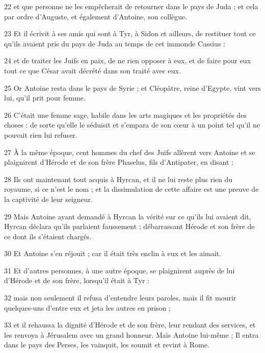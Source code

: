 \par 22 et que personne ne les empêcherait de retourner dans le pays de Juda ; et cela par ordre d'Auguste, et également d'Antoine, son collègue.

\par 23 Et il écrivit à ses amis qui sont à Tyr, à Sidon et ailleurs, de restituer tout ce qu'ils avaient pris du pays de Juda au temps de cet immonde Cassius :

\par 24 et de traiter les Juifs en paix, de ne rien opposer à eux, et de faire pour eux tout ce que César avait décrété dans son traité avec eux.

\par 25 Or Antoine resta dans le pays de Syrie ; et Cléopâtre, reine d'Egypte, vint vers lui, qu'il prit pour femme.

\par 26 C'était une femme sage, habile dans les arts magiques et les propriétés des choses : de sorte qu'elle le séduisit et s'empara de son cœur à un point tel qu'il ne pouvait rien lui refuser.

\par 27 À la même époque, cent hommes du chef des Juifs allèrent vers Antoine et se plaignirent d'Hérode et de son frère Phaselus, fils d'Antipater, en disant :

\par 28 Ils ont maintenant tout acquis à Hyrcan, et il ne lui reste plus rien du royaume, si ce n'est le nom ; et la dissimulation de cette affaire est une preuve de la captivité de leur seigneur.

\par 29 Mais Antoine ayant demandé à Hyrcan la vérité sur ce qu'ils lui avaient dit, Hyrcan déclara qu'ils parlaient faussement ; débarrassant Hérode et son frère de ce dont ils s'étaient chargés.

\par 30 Et Antoine s'en réjouit ; car il était très enclin à eux et les aimait.

\par 31 Et d'autres personnes, à une autre époque, se plaignirent auprès de lui d'Hérode et de son frère, lorsqu'il était à Tyr :

\par 32 mais non seulement il refusa d'entendre leurs paroles, mais il fit mourir quelques-uns d'entre eux et jeta les autres en prison ;

\par 33 et il rehaussa la dignité d'Hérode et de son frère, leur rendant des services, et les renvoya à Jérusalem avec un grand honneur. Mais Antoine lui-même ; Il entra dans le pays des Perses, les vainquit, les soumit et revint à Rome.

